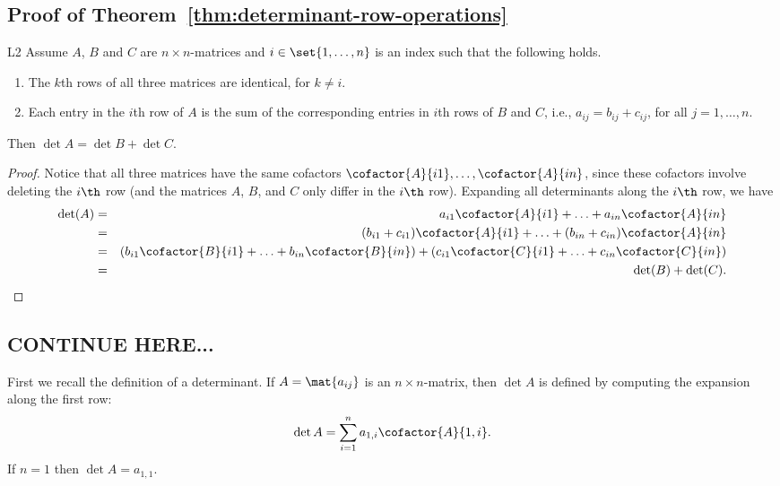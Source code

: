 \subsection{Proof of Theorem~\ref{thm:determinant-row-operations}}

\begin{lemma}{}{L2}
  Assume $A$, $B$ and $C$ are $n\times n$-matrices and
  $i\in\set{1,\ldots,n}$ is an index such that the following holds. 
  \begin{enumerate}
  \item The $k$th rows of all three matrices are identical, for $k\neq i$.

  \item Each entry in the $i$th row of $A$ is the sum of the
    corresponding entries in $i$th rows of $B$ and $C$, i.e.,
    $a_{ij}=b_{ij}+c_{ij}$, for all $j=1,\ldots,n$.
  \end{enumerate}
  Then $\det A=\det B+\det C$.
\end{lemma}

\begin{proof}
  Notice that all three matrices have the same cofactors
  $\cofactor{A}{i1},\ldots,\cofactor{A}{in}$, since these cofactors
  involve deleting the $i\th$ row (and the matrices $A$, $B$, and $C$
  only differ in the $i\th$ row). Expanding all determinants along the
  $i\th$ row, we have
  \begin{eqnarray*}
    \det(A)
    &=& a_{i1}\cofactor{A}{i1} + \ldots + a_{in}\cofactor{A}{in} \\
    &=& (b_{i1}+c_{i1})\cofactor{A}{i1} + \ldots + (b_{in}+c_{in})\cofactor{A}{in} \\
    &=& (b_{i1}\cofactor{B}{i1} + \ldots + b_{in}\cofactor{B}{in})
        + (c_{i1}\cofactor{C}{i1} + \ldots + c_{in}\cofactor{C}{in}) \\
    &=& \det(B) + \det(C).
  \end{eqnarray*}
\end{proof}

\subsection{CONTINUE HERE...}

First we recall the definition of a determinant. If $A=\mat{a_{ij} }$
is an $n\times n$-matrix, then $\det A$ is defined by computing the
expansion along the first row:
\begin{equation}
  \label{E1}
  \det A=\sum_{i=1}^n a_{1,i} \cofactor{A}{1,i}.
\end{equation}
If $n=1$ then $\det A=a_{1,1}$.

